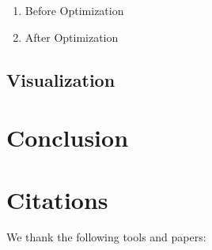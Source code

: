 \documentclass{article}
\begin{document}
\begin{enumerate}

\item Before Optimization

\item After Optimization

\end{enumerate}

\subsection{Visualization}



\section{Conclusion}



\section{Citations}

We thank the following tools and papers: \\\\
\end{document}
